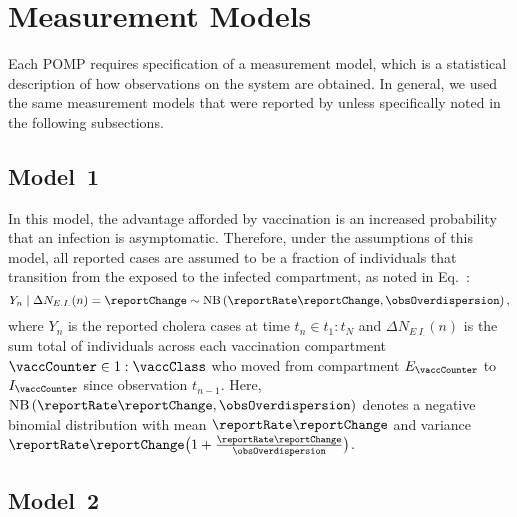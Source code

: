 \section{Measurement Models}

Each POMP requires specification of a measurement model, which is a statistical description of how observations on the system are obtained.
In general, we used the same measurement models that were reported by \cite{lee20} unless specifically noted in the following subsections.


\subsection{Model~1}

In this model, the advantage afforded by vaccination is an increased probability that an infection is asymptomatic.
Therefore, under the assumptions of this model, all reported cases are assumed to be a fraction of individuals that transition from the exposed to the infected compartment, as noted in Eq.~:
\begin{equation}
  \label{model1:meas}
  Y_{n} \mid \Delta N_{E_{\cdot}I_{\cdot}}(n) = \reportChange \sim \text{NB}\left(\reportRate \reportChange, \obsOverdispersion \right),
\end{equation}
where $Y_n$ is the reported cholera cases at time $t_n \in t_1:t_N$ and $\Delta N_{E_{\cdot}I_{\cdot}}(n)$ is the sum total of individuals across each vaccination compartment $\vaccCounter \in 1:\vaccClass$ who moved from compartment $E_\vaccCounter$ to $I_\vaccCounter$ since observation $t_{n-1}$.
Here, $\text{NB}\left(\reportRate \reportChange, \obsOverdispersion \right)$ denotes a negative binomial distribution with mean $\reportRate \reportChange$ and variance $\reportRate \reportChange \big(1 + \frac{\reportRate \reportChange}{\obsOverdispersion}\big)$.

\subsection{Model~2}\label{sec:mod2Meas}

